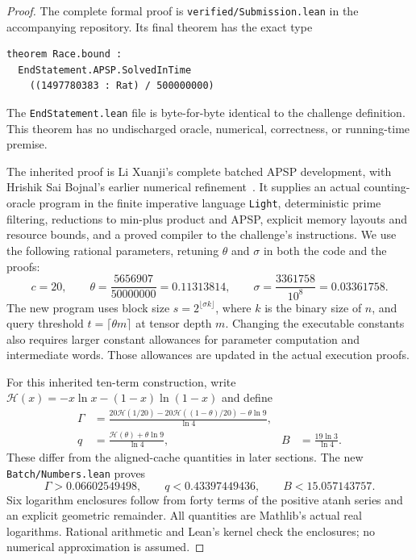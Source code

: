 \documentclass[11pt,a4paper]{article}
\newcommand{\HH}{\mathcal H}
\begin{document}
\begin{proof}
The complete formal proof is \texttt{verified/Submission.lean} in the
accompanying repository. Its final theorem has the exact type
\begin{verbatim}
theorem Race.bound :
  EndStatement.APSP.SolvedInTime
    ((1497780383 : Rat) / 500000000)
\end{verbatim}
The \texttt{EndStatement.lean} file is byte-for-byte identical to the
challenge definition. This theorem has no undischarged oracle, numerical,
correctness, or running-time premise.

The inherited proof is Li Xuanji's complete batched APSP development,
with Hrishik Sai Bojnal's earlier numerical refinement~\cite{verifiedbase}.
It supplies an actual counting-oracle program in the finite imperative
language \texttt{Light}, deterministic prime filtering, reductions to
min-plus product and APSP, explicit memory layouts and resource bounds,
and a proved compiler to the challenge's instructions. We use the
following rational parameters, retuning $\theta$ and $\sigma$ in both
the code and the proofs:
\[
 c=20,\qquad \theta=\frac{5656907}{50000000}=0.11313814,
 \qquad \sigma=\frac{3361758}{10^8}=0.03361758.
\]
The new program uses block size
$s=2^{\lfloor\sigma k\rfloor}$, where $k$ is the binary size of $n$,
and query threshold $t=\lceil\theta m\rceil$ at tensor depth $m$.
Changing the executable constants also requires larger constant
allowances for parameter computation and intermediate words. Those
allowances are updated in the actual execution proofs.

For this inherited ten-term construction, write
$\HH(x)=-x\ln x-(1-x)\ln(1-x)$ and define
\begin{align*}
 \Gamma&=\frac{20\HH(1/20)-20\HH((1-\theta)/20)-\theta\ln9}{\ln4},\\
 q&=\frac{\HH(\theta)+\theta\ln9}{\ln4},
 & B&=\frac{19\ln3}{\ln4}.
\end{align*}
These differ from the aligned-cache quantities in later sections.
The new \texttt{Batch/Numbers.lean} proves
\[
 \Gamma>0.06602549498,\qquad q<0.43397449436,
 \qquad B<15.057143757.
\]
Six logarithm enclosures follow from forty terms of the positive
atanh series and an explicit geometric remainder. All quantities are
Mathlib's actual real logarithms. Rational arithmetic and Lean's kernel
check the enclosures; no numerical approximation is assumed.


\end{proof}
\end{document}
